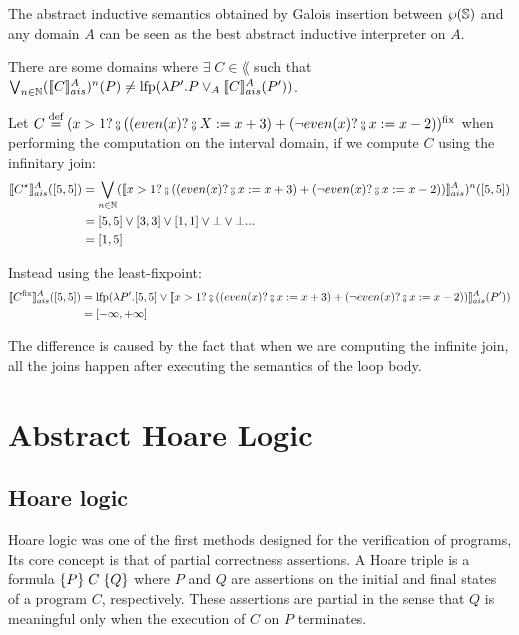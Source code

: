 \documentclass[
  10pt,       %
  twoside,    %
  a4paper,    %
  english,    %
  tikz,       %
  openright,  %
]{book}
\begin{document}
The abstract inductive semantics obtained by Galois insertion between 
$\wp(\mathbb{S})$ and any domain $A$ can be seen as the best abstract inductive 
interpreter on $A$.

\begin{observation}
  \label{obs:abstract-fix}
  There are some domains where $\exists \; C \in \lang$ such that
  $\bigvee_{n \in \mathbb{N}} (\llbracket C \rrbracket_{ais}^{A})^n(P) \neq \mathrm{lfp}(\lambda P'. P \lor_A
  \llbracket C \rrbracket_{ais}^{A}(P'))$.
\end{observation}
\begin{example}
  Let $C \defeq (x > 1? \fcmp ((even(x) ? \fcmp X := x + 3) +
  (\neg even(x)? \fcmp x := x - 2))^\fix$ when performing the computation on
  the interval domain, if we compute $C$ using the infinitary join:
  \begin{align*}
    \asem{C^\star}([5, 5])
      &= \bigvee_{n \in \mathbb{N}} (\asem{x > 1? \fcmp ((even(x) ? \fcmp x :=
        x + 3) + (\neg even(x)? \fcmp x := x - 2))})^n([5, 5]) \\
      &= [5, 5] \join [3, 3] \join [1, 1] \join \bot \join \bot ... \\
      &= [1, 5]
  \end{align*}

  Instead using the least-fixpoint:
  \begin{align*}
    \asem{C^\fix}([5, 5])
      &= \lfp(\lambda P' . [5, 5] \join \asem{x > 1? \fcmp ((even(x) ? \fcmp x :=
        x + 3) + (\neg even(x)? \fcmp x := x - 2))}(P')) \\
      &= [-\infty, +\infty]
\end{align*}

  The difference is caused by the fact that when we are computing the infinite 
  join, all the joins happen after executing the semantics of the loop body.
  
\end{example}
\section{Abstract Hoare Logic}
\label{chp:intro-ahorare}

\subsection{Hoare logic}
Hoare logic  \cite{Hoare69, Floyd93} was one of the first methods designed for 
the verification of programs, Its core concept is that of partial correctness 
assertions. A Hoare triple is a formula $\{ P \} \; C \; \{ Q \}$ where $P$ and $Q$ are 
assertions on the initial and final states of a program $C$, respectively. 
These assertions are partial in the sense that $Q$ is meaningful only when the 
execution of $C$ on $P$ terminates.
\end{document}
